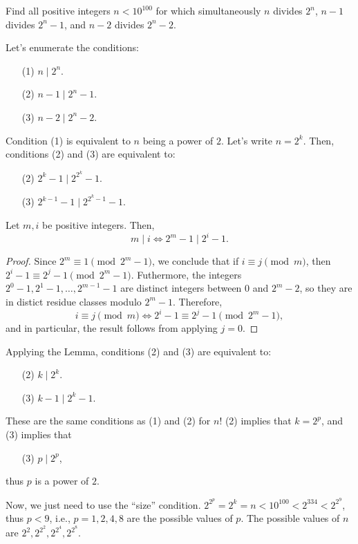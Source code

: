
\begin{prob}[Putnam 2018, B3]
Find all positive integers $n < 10^{100}$ for which simultaneously $n$ divides $2^n$, $n-1$ divides $2^n - 1$, and $n-2$ divides $2^n - 2$.
\end{prob}

\begin{sol}
	Let's enumerate the conditions:
	\begin{enumerate}
		\item[(1)] \(n \mid 2^n\).
		\item[(2)] \(n - 1 \mid 2^n - 1\).
		\item[(3)] \(n - 2 \mid 2^n - 2\).
	\end{enumerate}

	Condition (1) is equivalent to \(n\) being a power of \(2\). Let's write \(n = 2^k\). Then, conditions (2) and (3) are equivalent to:
	\begin{enumerate}
		\item[(2)] \(2^k - 1 \mid 2^{2^k} - 1\).
		\item[(3)] \(2^{k-1} - 1 \mid 2^{2^k - 1} - 1\).
	\end{enumerate}

	\begin{lem}
		Let \(m, i\) be positive integers. Then,
		\[m \mid i \iff 2^m - 1 \mid 2^i - 1.\]
	\end{lem}
	\begin{proof}
	Since \(2^m \equiv 1 \pmod{2^m - 1}\), we conclude that if \(i \equiv j \pmod{m}\), then \(2^i - 1 \equiv 2^j - 1 \pmod{2^m - 1}\).
	Futhermore, the integers \(2^0 - 1, 2^1 - 1, \dots, 2^{m-1} - 1\) are distinct integers between \(0\) and \(2^m - 2\), so they are in distict residue classes modulo  \(2^m - 1\). Therefore, \[
		i \equiv j \pmod{m} \iff 2^i - 1 \equiv 2^j - 1 \pmod{2^m - 1},
	\]
	and in particular, the result follows from applying \(j = 0\).
	\end{proof}

	Applying the Lemma, conditions (2) and (3) are equivalent to:
	\begin{enumerate}
		\item[(2)] \(k \mid 2^k\).
		\item[(3)] \(k - 1 \mid 2^k - 1\).
	\end{enumerate}

	These are the same conditions as (1) and (2) for \(n\)! (2) implies that \(k = 2^p\), and (3) implies that
	\begin{enumerate}
		\item[(3)] \(p \mid 2^p\),
	\end{enumerate}
	thus \(p\) is a power of \(2\).

	Now, we just need to use the ``size'' condition.  \(2^{2^p} = 2^k = n < 10^{100} < 2^{334} < 2^{2^{9}}\), thus \(p < 9\), i.e.,  \(p = 1, 2, 4, 8\) are the possible values of \(p\). The  possible values of \(n\) are \(2^2, 2^{2^2}, 2^{2^4}, 2^{2^8}\).
\end{sol}


